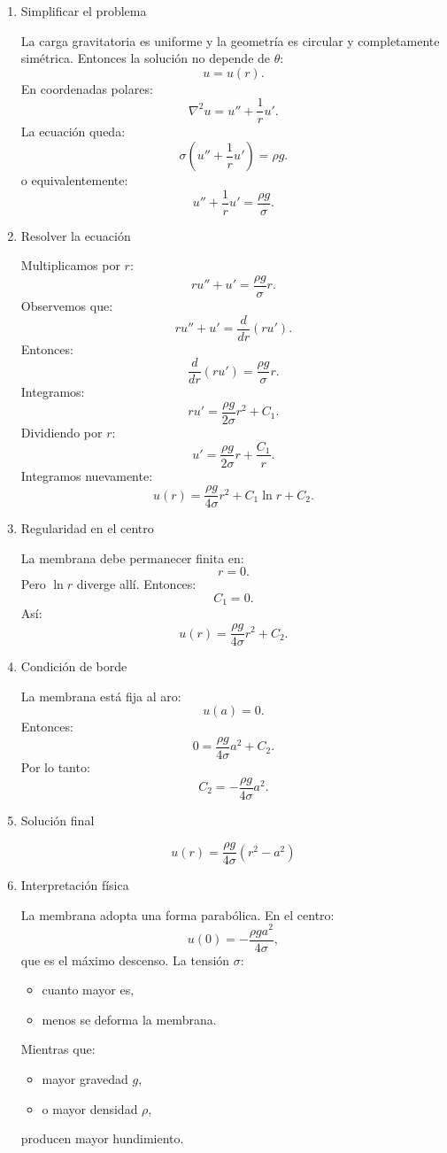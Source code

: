 \documentclass[11pt,spanish]{article}
\newcounter{problema}
\begin{document}
\begin{enumerate}
\item Simplificar el problema

La carga gravitatoria es uniforme y la geometría es circular y completamente simétrica.
Entonces la solución no depende de $\theta$:
$$
u=u(r).
$$
En coordenadas polares:
$$
\nabla^2 u=
u''+\frac1r u'.
$$
La ecuación queda:
$$
\sigma\left(
u''+\frac1r u'
\right)=\rho g.
$$
o equivalentemente:
$$
u''+\frac1r u'
=
\frac{\rho g}{\sigma}.
$$


\item Resolver la ecuación

Multiplicamos por $r$:
$$
r u''+u'
=
\frac{\rho g}{\sigma}r.
$$
Observemos que:
$$
ru''+u'=\frac{d}{dr}(ru').
$$
Entonces:
$$
\frac{d}{dr}(ru')
=
\frac{\rho g}{\sigma}r.
$$
Integramos:
$$
ru'
=
\frac{\rho g}{2\sigma}r^2+C_1.
$$
Dividiendo por $r$:
$$
u'
=
\frac{\rho g}{2\sigma}r+\frac{C_1}{r}.
$$
Integramos nuevamente:
$$
u(r)=
\frac{\rho g}{4\sigma}r^2
+
C_1\ln r
+
C_2.
$$

\item Regularidad en el centro

La membrana debe permanecer finita en:
$$
r=0.
$$
Pero $\ln r$ diverge allí.
Entonces:
$$
C_1=0.
$$
Así:
$$
u(r)=
\frac{\rho g}{4\sigma}r^2+C_2.
$$

\item Condición de borde

La membrana está fija al aro:
$$
u(a)=0.
$$
Entonces:
$$
0=
\frac{\rho g}{4\sigma}a^2+C_2.
$$
Por lo tanto:
$$
C_2=
-\frac{\rho g}{4\sigma}a^2.
$$

\item Solución final

$$
\boxed{
u(r)=
\frac{\rho g}{4\sigma}
\left(
r^2-a^2
\right)
}
$$

\item Interpretación física

La membrana adopta una forma parabólica.
En el centro:
$$
u(0)=
-\frac{\rho g a^2}{4\sigma},
$$
que es el máximo descenso.
La tensión $\sigma$:
\begin{itemize}
\item cuanto mayor es,
\item menos se deforma la membrana.
\end{itemize}
Mientras que:
\begin{itemize}
\item mayor gravedad $g$,
\item o mayor densidad $\rho$,
\end{itemize}
producen mayor hundimiento.

\end{enumerate}
\end{document}
